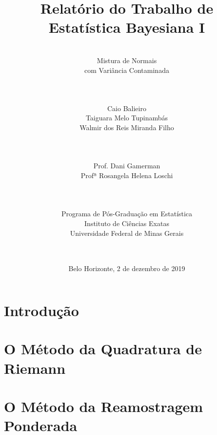 \documentclass[12pt,reqno,a4paper,oneside]{report}
\begin{document}
\title{\huge Relatório do Trabalho de\\
	Estatística Bayesiana I}
\author{\\
	\huge Mistura de Normais\\
	\huge com Variância Contaminada
	\\
	\\
	\\
	\\
	\Large Caio Balieiro\\
	\Large Taiguara Melo Tupinambás\\
	\Large Walmir dos Reis Miranda Filho\\
	\\
	\\
	\\
	\Large Prof. Dani Gamerman\\
	\Large Profª Rosangela Helena Loschi\\
	\\
	\\
	\\
	Programa de Pós-Graduação em Estatística\\
	Instituto de Ciências Exatas\\
	Universidade Federal de Minas Gerais\\
	\\
	\\}
\date{Belo Horizonte, 2 de dezembro de 2019}
\maketitle

\section*{\Large Introdução}


\section*{\Large O Método da Quadratura de Riemann}


\section*{\Large O Método da Reamostragem Ponderada}
\end{document}
